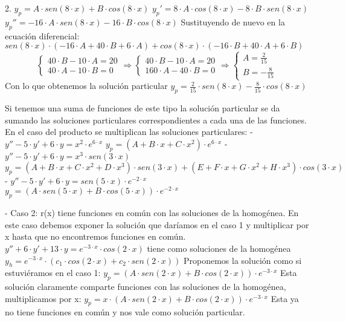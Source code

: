\begin{sol}
	2. $y_p = A\cdot sen(8\cdot x) + B\cdot cos(8\cdot x)$  
	$y_p' = 8\cdot A\cdot cos(8\cdot x) - 8\cdot B\cdot sen(8\cdot x)$  
	$y_p'' = -16\cdot A\cdot sen(8\cdot x) - 16\cdot B\cdot cos(8\cdot x)$  
	Sustituyendo de nuevo en la ecuación diferencial:  
	$sen(8\cdot x)\cdot (-16\cdot A + 40\cdot B + 6\cdot A) + cos(8\cdot x)\cdot (-16\cdot B + 40\cdot A + 6\cdot B)$
	$$
	\begin{cases}
	40\cdot B - 10\cdot A = 20 \\
	40\cdot A - 10\cdot B = 0
	\end{cases}
	\Rightarrow
	\begin{cases}
	40\cdot B - 10\cdot A = 20 \\
	160\cdot A - 40\cdot B = 0
	\end{cases}
	\Rightarrow
	\begin{cases}
	A = \frac{2}{15} \\
	B = -\frac{8}{15}
	\end{cases}
	$$
	Con lo que obtenemos la solución particular $y_p = \frac{2}{15}\cdot sen(8\cdot x) - \frac{8}{15}\cdot cos(8\cdot x)$
	
	Si tenemos una suma de funciones de este tipo la solución particular se da sumando las soluciones particulares correspondientes a cada una de las funciones.  
	En el caso del producto se multiplican las soluciones particulares:  
	- $y'' - 5\cdot y' + 6\cdot y = x^2\cdot e^{6\cdot x}$  
	$y_p = (A+B\cdot x + C\cdot x^2)\cdot e^{6\cdot x}$  
	- $y'' - 5\cdot y' + 6\cdot y = x^3\cdot sen(3\cdot x)$  
	$y_p = (A+B\cdot x + C\cdot x^2 + D\cdot x^3)\cdot sen(3\cdot x) + (E + F\cdot x + G\cdot x^2 + H\cdot x^3)\cdot cos(3\cdot x)$  
	- $y'' - 5\cdot y' + 6\cdot y = sen(5\cdot x)\cdot e^{-2\cdot x}$  
	$y_p = (A\cdot sen(5\cdot x) + B\cdot cos(5\cdot x))\cdot e^{-2\cdot x}$  
	
	- Caso 2: r(x) tiene funciones en común con las soluciones de la homogénea.  
	En este caso debemos exponer la solución que daríamos en el caso 1 y multiplicar por x hasta que no encontremos funciones en común.  
	$y'' + 6\cdot y' + 13\cdot y =e^{-3\cdot x}\cdot cos(2\cdot x)$ tiene como soluciones de la homogénea $y_h = e^{-3\cdot x}\cdot (c_1\cdot cos(2\cdot x) + c_2\cdot sen(2\cdot x))$  
	Proponemos la solución como si estuviéramos en el caso 1:  
	$y_p = (A\cdot sen(2\cdot x) + B\cdot cos(2\cdot x))\cdot e^{-3\cdot x}$  
	Esta solución claramente comparte funciones con las soluciones de la homogénea, multiplicamos por x:  
	$y_p = x\cdot (A\cdot sen(2\cdot x) + B\cdot cos(2\cdot x))\cdot e^{-3\cdot x}$  
	Esta ya no tiene funciones en común y nos vale como solución particular.
\end{sol}

